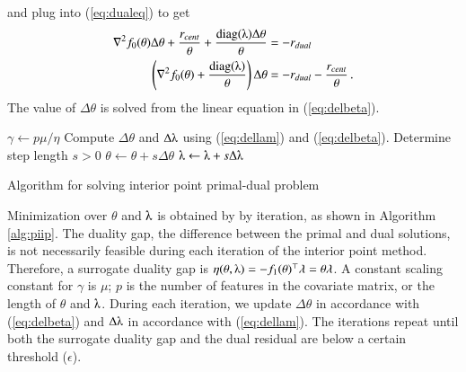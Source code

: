 \documentclass[11pt]{article}
\begin{document}
and plug into (\ref{eq:dualeq}) to get
\begin{align}
\nabla^2f_0(\theta)\Delta\theta +\frac{r_{cent}}{\theta} + \frac{\text{diag}(\lambdaup)\Delta\theta}{\theta} &= -r_{dual}\nonumber\\ 
\left(\nabla^2f_0(\theta) + \frac{\text{diag}(\lambdaup)}{\theta}\right)\Delta\theta &= -r_{dual} - \frac{r_{cent}}{\theta}\,.\label{eq:delbeta}
\end{align}
The value of $\Delta\theta$ is solved from the linear equation in (\ref{eq:delbeta}).

\begin{algorithm}\begingroup\fontsize{10}{10}\selectfont
\begin{algorithmic}
\State
{}
	\State $\gamma \gets p\mu/\eta$
	\State Compute $\Delta\theta$ and $\Delta\lambdaup$ using (\ref{eq:dellam}) and (\ref{eq:delbeta}).
	\State Determine step length $s>0$
	\State $\theta \gets \theta + s\Delta\theta$
	\State $\lambdaup \gets \lambdaup + s\Delta\lambdaup$
\EndWhile
\end{algorithmic}\endgroup\caption{Algorithm for solving interior point primal-dual problem}\label{alg:piip}
\end{algorithm} 

Minimization over $\theta$ and $\lambdaup$ is obtained by by iteration, as shown in Algorithm \ref{alg:piip}. The duality gap, the difference between the primal and dual solutions, is not necessarily feasible during each iteration of the interior point method. Therefore, a surrogate duality gap is $\eta(\theta, \lambdaup) = -f_1(\theta)^\top\lambda = \theta\lambda$. A constant scaling constant for $\gamma$ is $\mu$; $p$ is the number of features in the covariate matrix, or the length of $\theta$ and $\lambdaup$. During each iteration, we update $\Delta\theta$ in accordance with (\ref{eq:delbeta}) and $\Delta\lambdaup$ in accordance with (\ref{eq:dellam}). The iterations repeat until both the surrogate duality gap and the dual residual are below a certain threshold ($\epsilon$).

\vspace{50pt}
\end{document}
